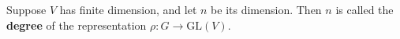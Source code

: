Suppose $V$ has finite dimension, and let $n$ be its dimension. Then $n$ is called the \textbf{degree} of the representation $\rho: G \to \text{GL}(V)$.
